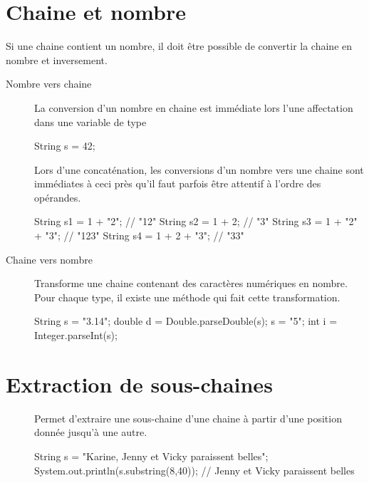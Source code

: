 	
\section{Chaine et nombre}

	Si une chaine contient un nombre, il doit être possible de convertir la
	chaine en nombre et inversement.

	\begin{description}
	
		\item[Nombre vers chaine]			
			La conversion d'un nombre en chaine est immédiate lors l'une
			affectation dans une variable de type 

			\begin{java}
				String s = 42;
			\end{java}

			Lors d'une concaténation, les conversions d'un nombre vers une
			chaine sont immédiates à ceci près qu'il faut parfois être attentif
			à l'ordre des opérandes.

			\begin{java}
				String s1 = 1 + "2";        // "12"
				String s2 = 1 + 2;          // "3"
				String s3 = 1 + "2" + "3";  // "123"
				String s4 = 1 + 2 + "3";    // "33"
			\end{java}

		\item[Chaine vers nombre]
		Transforme une chaine contenant des caractères numériques 
		en nombre. Pour chaque type, il existe une méthode qui fait cette
		transformation. 

		\begin{java}
String s = "3.14";		
double d = Double.parseDouble(s);			
s = "5";
int i = Integer.parseInt(s);
		\end{java}

	\end{description}
	
\section{Extraction de sous-chaines}

	\begin{description}
	\item[]
		
		Permet d’extraire une sous-chaine d'une chaine à partir d'une position
		donnée jusqu'à une autre. 

		\begin{java}
String s = "Karine, Jenny et Vicky paraissent belles";			
System.out.println(s.substring(8,40)); 
	// Jenny et Vicky paraissent belles
		\end{java}
	
	\end{description}

